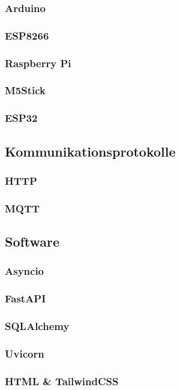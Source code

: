 \documentclass[12pt, letterpaper]{article}
\begin{document}
    \subsubsection{Arduino}
    \subsubsection{ESP8266}
    \subsubsection{Raspberry Pi}
    \subsubsection{M5Stick}
    \subsubsection{ESP32}

  \subsection{Kommunikationsprotokolle}
  \subsubsection{HTTP}
  \subsubsection{MQTT}
    
  \subsection{Software}
    \subsubsection{Asyncio}
    \subsubsection{FastAPI}
    \subsubsection{SQLAlchemy}
    \subsubsection{Uvicorn}
    \subsubsection{HTML \& TailwindCSS}
\end{document}
